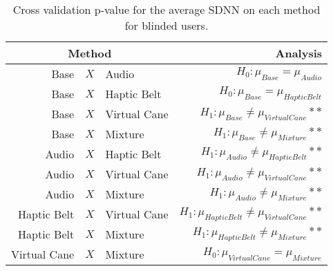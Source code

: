 
\begin{table}[!htb]
\centering
\caption{Cross validation p-value for the average SDNN on each method for blinded users.}
\label{tab:lsd_sdnn_two_way}
\begin{tabular}{rclr}
\toprule
      \multicolumn{3}{c}{Method} &                                           Analysis \\
\midrule
              Base & $X$ & Audio &                   $H_0 : \mu_{Base} = \mu_{Audio}$ \\
        Base & $X$ & Haptic Belt &             $H_0 : \mu_{Base} = \mu_{Haptic Belt}$ \\
       Base & $X$ & Virtual Cane &        $H_1 : \mu_{Base} \ne \mu_{Virtual Cane}**$ \\
            Base & $X$ & Mixture &             $H_1 : \mu_{Base} \ne \mu_{Mixture}**$ \\
       Audio & $X$ & Haptic Belt &        $H_1 : \mu_{Audio} \ne \mu_{Haptic Belt}**$ \\
      Audio & $X$ & Virtual Cane &       $H_1 : \mu_{Audio} \ne \mu_{Virtual Cane}**$ \\
           Audio & $X$ & Mixture &            $H_1 : \mu_{Audio} \ne \mu_{Mixture}**$ \\
Haptic Belt & $X$ & Virtual Cane & $H_1 : \mu_{Haptic Belt} \ne \mu_{Virtual Cane}**$ \\
     Haptic Belt & $X$ & Mixture &      $H_1 : \mu_{Haptic Belt} \ne \mu_{Mixture}**$ \\
    Virtual Cane & $X$ & Mixture &         $H_0 : \mu_{Virtual Cane} = \mu_{Mixture}$ \\
\bottomrule
\end{tabular}
\end{table}

